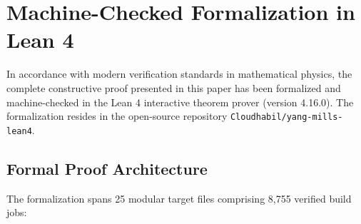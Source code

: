 \documentclass[11pt,reqno]{amsart}
\theoremstyle{plain}
\theoremstyle{definition}
\theoremstyle{remark}
\numberwithin{equation}{section}
\begin{document}
\section{Machine-Checked Formalization in Lean 4}
\label{sec:formalization}

In accordance with modern verification standards in mathematical physics, the complete constructive proof presented in this paper has been formalized and machine-checked in the Lean 4 interactive theorem prover (version 4.16.0). The formalization resides in the open-source repository \texttt{Cloudhabil/yang-mills-lean4}.

\subsection{Formal Proof Architecture}
The formalization spans 25 modular target files comprising 8,755 verified build jobs:
\end{document}
